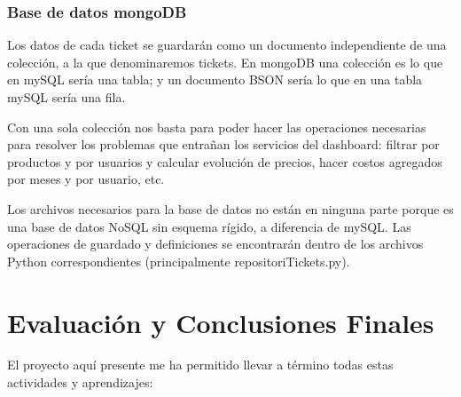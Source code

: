 \documentclass[a4paper,12pt]{report}
\begin{document}
	
	\subsection{Base de datos mongoDB}
	
	Los datos de cada ticket se guardarán como un documento independiente de una colección, a la que denominaremos tickets. En mongoDB una colección es lo que en mySQL sería una tabla; y un documento BSON sería lo que en una tabla mySQL sería una fila.
	
	Con una sola colección nos basta para poder hacer las operaciones necesarias para resolver los problemas que entrañan los servicios del dashboard: filtrar por productos y por usuarios y calcular evolución de precios, hacer costos agregados por meses y por usuario, etc.
	
	Los archivos necesarios para la base de datos no están en ninguna parte porque es una base de datos NoSQL sin esquema rígido, a diferencia de mySQL. Las operaciones de guardado y definiciones se encontrarán dentro de los archivos Python correspondientes (principalmente repositoriTickets.py).
	
	\chapter{Evaluación y Conclusiones Finales} %
	
	El proyecto aquí presente me ha permitido llevar a término todas estas actividades y aprendizajes: 
	
\end{document}
